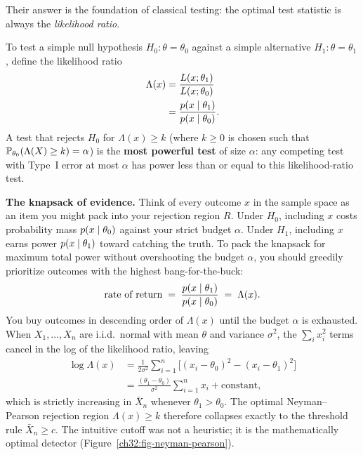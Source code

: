 Their answer is the foundation of classical testing: the optimal test statistic is always the \emph{likelihood ratio}.

\begin{theorem}
\label{ch32:thm-neyman-pearson}
To test a simple null hypothesis $H_0\!: \theta = \theta_0$ against a simple alternative $H_1\!: \theta = \theta_1$, define the likelihood ratio
\begin{align*}
  \Lambda(x) &= \frac{L(x; \theta_1)}{L(x; \theta_0)} \\
             &= \frac{p(x \given \theta_1)}{p(x \given \theta_0)}.
\end{align*}
A test that rejects $H_0$ for $\Lambda(x) \ge k$ (where $k \ge 0$ is chosen such that $\P_{\theta_0}(\Lambda(X) \ge k) = \alpha$) is the \textbf{most powerful test} of size $\alpha$: any competing test with Type~I error at most $\alpha$ has power less than or equal to this likelihood-ratio test.
\end{theorem}

\begin{intuitionbox}
\textbf{The knapsack of evidence.}
Think of every outcome $x$ in the sample space as an item you might pack into your rejection region $R$.
Under $H_0$, including $x$ costs probability mass $p(x\given \theta_0)$ against your strict budget $\alpha$.
Under $H_1$, including $x$ earns power $p(x\given \theta_1)$ toward catching the truth.
To pack the knapsack for maximum total power without overshooting the budget $\alpha$, you should greedily prioritize outcomes with the highest bang-for-the-buck:
\[
  \text{rate of return} \;=\; \frac{p(x \given \theta_1)}{p(x \given \theta_0)} \;=\; \Lambda(x).
\]
You buy outcomes in descending order of $\Lambda(x)$ until the budget $\alpha$ is exhausted.
When $X_1, \dots, X_n$ are i.i.d.\ normal with mean $\theta$ and variance $\sigma^2$, the $\sum_i x_i^2$ terms cancel in the log of the likelihood ratio, leaving
\begin{align*}
  \log\Lambda(x) &= \frac{1}{2\sigma^2}\sum_{i=1}^n \big[(x_i - \theta_0)^2 - (x_i - \theta_1)^2\big] \\
                 &= \frac{(\theta_1 - \theta_0)}{\sigma^2}\sum_{i=1}^n x_i + \text{constant},
\end{align*}
which is strictly increasing in $\bar X_n$ whenever $\theta_1 > \theta_0$. The optimal Neyman--Pearson rejection region $\Lambda(x) \ge k$ therefore collapses exactly to the threshold rule $\bar X_n \ge c$. The intuitive cutoff was not a heuristic; it is the mathematically optimal detector (Figure~\ref{ch32:fig-neyman-pearson}).
\end{intuitionbox}


